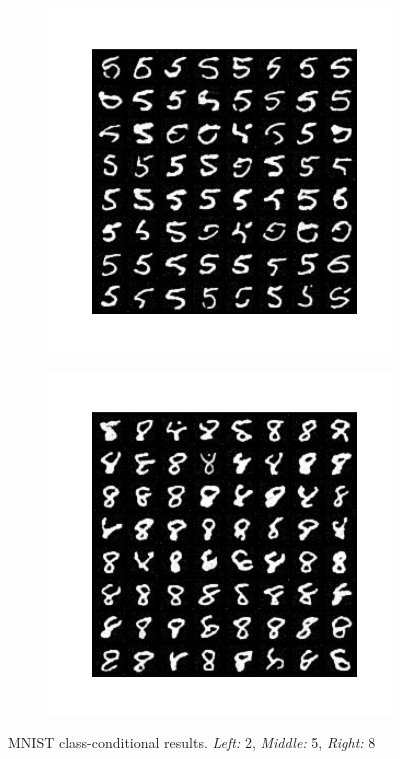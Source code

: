 \begin{figure}
\begin{subfigure}{0.3\textwidth}
        \includegraphics[width=\textwidth]{Chapters/figures/experiments/mnist/mnist_5.png}
    \end{subfigure}
    \begin{subfigure}{0.3\textwidth} \label{abb:1a}
        \centering
        \includegraphics[width=\textwidth]{Chapters/figures/experiments/mnist/mnist_8.png}
    \end{subfigure}
    
    \caption{MNIST class-conditional results. \textit{Left:} 2, \textit{Middle:} 5, \textit{Right:} 8}
    \label{fig:my_label}
\end{figure}
%


